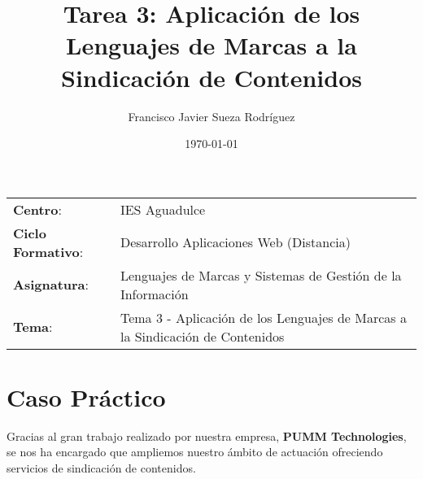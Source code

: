 


\title{
\vspace{10ex}
\normalfont \normalsize
\Huge \textbf{Tarea 3: Aplicación de los Lenguajes de Marcas a la Sindicación de Contenidos}
}
\author{Francisco Javier Sueza Rodríguez}
\date{\normalsize\today}



\maketitle

\thispagestyle{empty}

\vspace{62ex}

\begin{center}
    \begin{tabular}{l l}
        \textbf{Centro}: & IES Aguadulce \\
        \textbf{Ciclo Formativo}: & Desarrollo Aplicaciones Web (Distancia)\\
        \textbf{Asignatura}: & Lenguajes de Marcas y Sistemas de Gestión de la Información\\
        \textbf{Tema}: & Tema 3 -  Aplicación de los Lenguajes de Marcas a la Sindicación de Contenidos\\
    \end{tabular}
\end{center}

\newpage

\tableofcontents

\newpage

\listoffigures

\newpage

\section{Caso Práctico}
Gracias al gran trabajo realizado por nuestra empresa, \textbf{PUMM Technologies}, se nos ha encargado que ampliemos nuestro ámbito de actuación ofreciendo servicios de sindicación de contenidos.

